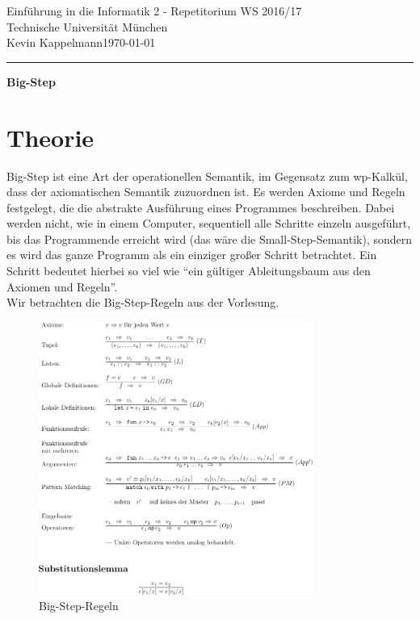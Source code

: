 \documentclass[hidelinks]{article}
\theoremstyle{plain}
\theoremstyle{definition}
\theoremstyle{rem}
\begin{document}

\begin{sloppypar}
\begingroup  
  \LARGE Einführung in die Informatik 2 - Repetitorium WS 2016/17\\Technische Universität München\\[0.5em]
  \large{Kevin Kappelmann\hfill \today}\\
\endgroup
\hrule height 1pt
{\LARGE{{\begin{center}\textbf{Big-Step}\end{center}}}}
\section{Theorie}
Big-Step ist eine Art der operationellen Semantik, im Gegensatz zum wp-Kalkül, dass der axiomatischen Semantik zuzuordnen ist. Es werden Axiome und Regeln festgelegt, die die abstrakte Ausführung eines Programmes beschreiben. Dabei werden nicht, wie in einem Computer, sequentiell alle Schritte einzeln ausgeführt, bis das Programmende erreicht wird (das wäre die Small-Step-Semantik), sondern es wird das ganze Programm als ein einziger großer Schritt betrachtet. Ein Schritt bedeutet hierbei so viel wie ``ein gültiger Ableitungsbaum aus den Axiomen und Regeln''.\\
Wir betrachten die Big-Step-Regeln aus der Vorlesung.
\begin{figure}[ht]
	\includegraphics[width=0.8\textwidth]{big_step_rules.png}
	\centering
	\caption{Big-Step-Regeln}\label{big_step_rules}
\end{figure}

\end{sloppypar}
\end{document}
